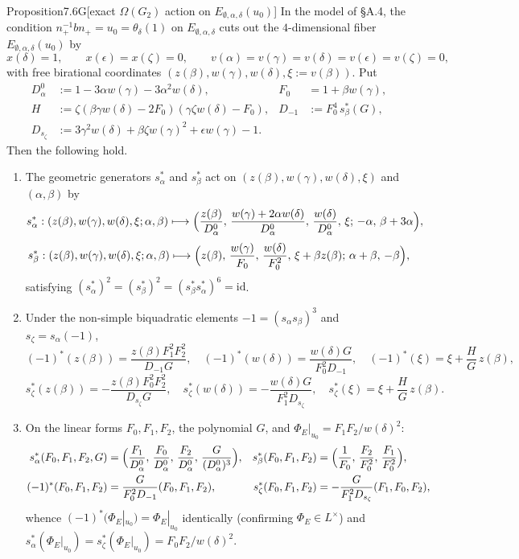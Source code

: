 \documentclass[12pt,letterpaper]{amsart}
\theoremstyle{plain}
\theoremstyle{definition}
\theoremstyle{remark}
\theoremstyle{definition}
\begin{document}
\begin{res}{Proposition}{7.6G}[exact $\Omega(G_2)$ action on $E_{\emptyset,\alpha,\delta}(u_0)$]\label{res:7.6G}
In the model of \S A.4, the condition $n_+^{-1}bn_+=u_0=\theta_\delta(1)$ on
$E_{\emptyset,\alpha,\delta}$ cuts out the $4$-dimensional fiber
$E_{\emptyset,\alpha,\delta}(u_0)$ by
\[
x(\delta)=1,\qquad x(\epsilon)=x(\zeta)=0,\qquad
v(\alpha)=v(\gamma)=v(\delta)=v(\epsilon)=v(\zeta)=0,
\]
with free birational
coordinates $(z(\beta),w(\gamma),w(\delta),\xi:=v(\beta))$. Put
\begin{align*}
D_\alpha^0&:=1-3\alpha w(\gamma)-3\alpha^2w(\delta), &
F_0&=1+\beta w(\gamma),\\
H&:=\zeta(\beta\gamma w(\delta)-2F_0)(\gamma\zeta w(\delta)-F_0), &
D_{-1}&:=F_0^4\,s_\beta^*(G),\\
D_{s_\zeta}&:=3\gamma^2w(\delta)+\beta\zeta w(\gamma)^2+\epsilon w(\gamma)-1.
\end{align*}
Then the following hold.
\begin{enumerate}[{\upshape(a)}]
\item The geometric generators $s_\alpha^*$ and $s_\beta^*$ act on
$(z(\beta),w(\gamma),w(\delta),\xi)$ and $(\alpha,\beta)$ by
\[
s_\alpha^*:(z(\beta),w(\gamma),w(\delta),\xi;\alpha,\beta)\longmapsto
\Bigl(\frac{z(\beta)}{D_\alpha^0},\,\frac{w(\gamma)+2\alpha w(\delta)}{D_\alpha^0},\,
\frac{w(\delta)}{D_\alpha^0},\,\xi;\,-\alpha,\,\beta+3\alpha\Bigr),
\]
\[
s_\beta^*:(z(\beta),w(\gamma),w(\delta),\xi;\alpha,\beta)\longmapsto
\Bigl(z(\beta),\,\frac{w(\gamma)}{F_0},\,\frac{w(\delta)}{F_0^2},\,
\xi+\beta z(\beta);\,\alpha+\beta,\,-\beta\Bigr),
\]
satisfying $(s_\alpha^*)^2=(s_\beta^*)^2=(s_\beta^*s_\alpha^*)^6=\mathrm{id}$.
\item Under the non-simple biquadratic elements $-1=(s_\alpha s_\beta)^3$ and
$s_\zeta=s_\alpha(-1)$,
\[
(-1)^*(z(\beta))=\frac{z(\beta)F_1^2F_2^2}{D_{-1}G},\quad
(-1)^*(w(\delta))=\frac{w(\delta)G}{F_0^2D_{-1}},\quad
(-1)^*(\xi)=\xi+\frac{H}{G}\,z(\beta),
\]
\[
s_\zeta^*(z(\beta))=-\frac{z(\beta)F_0^2F_2^2}{D_{s_\zeta}G},\quad
s_\zeta^*(w(\delta))=-\frac{w(\delta)G}{F_1^2D_{s_\zeta}},\quad
s_\zeta^*(\xi)=\xi+\frac{H}{G}\,z(\beta).
\]
\item On the linear forms $F_0,F_1,F_2$, the polynomial $G$, and
$\Phi_E|_{u_0}=F_1F_2/w(\delta)^2$:
\[
\begin{aligned}
s_\alpha^*(F_0,F_1,F_2,G)&=\Bigl(\frac{F_1}{D_\alpha^0},\,\frac{F_0}{D_\alpha^0},\,
\frac{F_2}{D_\alpha^0},\,\frac{G}{(D_\alpha^0)^3}\Bigr),&
s_\beta^*(F_0,F_1,F_2)&=\Bigl(\frac{1}{F_0},\,\frac{F_2}{F_0^2},\,\frac{F_1}{F_0^2}\Bigr),\\
(-1)^*(F_0,F_1,F_2)&=\frac{G}{F_0^2D_{-1}}(F_0,F_1,F_2),&
s_\zeta^*(F_0,F_1,F_2)&=-\frac{G}{F_1^2D_{s_\zeta}}(F_1,F_0,F_2),
\end{aligned}
\]
whence $(-1)^*(\Phi_E|_{u_0})=\Phi_E|_{u_0}$ identically (confirming
$\Phi_E\in L^\times$) and
$s_\alpha^*(\Phi_E|_{u_0})=s_\zeta^*(\Phi_E|_{u_0})=F_0F_2/w(\delta)^2$.
\end{enumerate}
\end{res}
\end{document}
